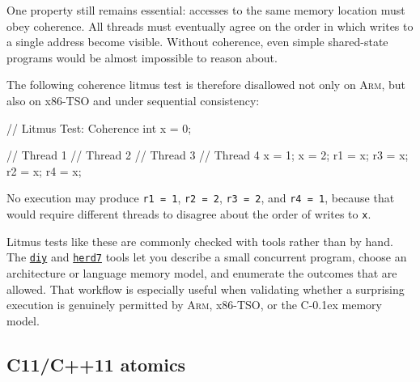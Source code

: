 \documentclass[fontsize=10pt, oneside]{scrartcl}
\newcommand{\monobox}[1]{\mbox{\texttt{#1}}}
\newcommand{\cplusplus}[1]{C\kern-0.1ex\raisebox{0.15ex}{\texttt{++}}}
\begin{document}
One property still remains essential: accesses to the same memory location must obey coherence.
All threads must eventually agree on the order in which writes to a single address become visible.
Without coherence, even simple shared-state programs would be almost impossible to reason about.

The following coherence litmus test is therefore disallowed not only on \textsc{Arm}, but also on x86-TSO and under sequential consistency:

\begin{ccode}
// Litmus Test: Coherence
int x = 0;

// Thread 1    // Thread 2    // Thread 3    // Thread 4
x = 1;         x = 2;         r1 = x;        r3 = x;
                              r2 = x;        r4 = x;
\end{ccode}

No execution may produce \monobox{r1 = 1}, \monobox{r2 = 2}, \monobox{r3 = 2}, and \monobox{r4 = 1}, because that would require different threads to disagree about the order of writes to \monobox{x}.

Litmus tests like these are commonly checked with tools rather than by hand.
The \href{https://diy.inria.fr/}{\texttt{diy}} and \href{https://github.com/herd/herdtools7}{\texttt{herd7}} tools let you describe a small concurrent program, choose an architecture or language memory model, and enumerate the outcomes that are allowed.
That workflow is especially useful when validating whether a surprising execution is genuinely permitted by \textsc{Arm}, x86-TSO, or the \cplusplus{} memory model.

\subsection{C11/C++11 atomics}
\end{document}
